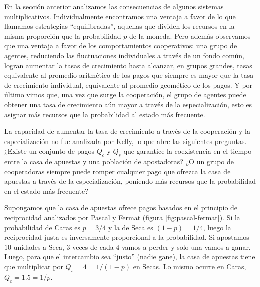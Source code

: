 \documentclass[a4paper,10pt]{book}
\theoremstyle{definition}
\begin{document}

En la sección anterior analizamos las consecuencias de algunos sistemas multiplicativos.
%
Individualmente encontramos una ventaja a favor de lo que llamamos estrategias ``equilibradas'', aquellas que dividen los recursos en la misma proporción que la probabilidad $p$ de la moneda.
%
Pero además observamos que una ventaja a favor de los comportamientos cooperativos: una grupo de agentes, reduciendo las fluctuaciones individuales a través de un fondo común, logran aumentar la tasas de crecimiento hasta alcanzar, en grupos grandes, tasas equivalente al promedio aritmético de los pagos que siempre es mayor que la tasa de crecimiento individual, equivalente al promedio geomético de los pagos.
%
Y por último vimos que, una vez que surge la cooperación, el grupo de agentes puede obtener una tasa de crecimiento aún mayor a través de la especialización, esto es asignar más recursos que la probabilidad al estado más frecuente. 


La capacidad de aumentar la tasa de crecimiento a través de la cooperación y la especialización no fue analizada por Kelly, lo que abre las siguientes preguntas.
%
¿Existe un conjunto de pagos $Q_c$ y $Q_s$ que garantice la coexistencia en el tiempo entre la casa de apuestas y una población de apostadoras?
%
¿O un grupo de cooperadoras siempre puede romper cualquier pago que ofrezca la casa de apuestas a través de la especialización, poniendo más recursos que la probabilidad en el estado más frecuente?


Supongamos que la casa de apuestas ofrece pagos basados en el principio de reciprocidad analizados por Pascal y Fermat (figura \ref{fig:pascal-fermat}).
%
Si la probabilidad de Caras es $p=3/4$ y la de Seca es $(1-p) = 1/4$, luego la reciprocidad justa es inversamente proporcional a la probabilidad.
%
Si apostamos $10$ unidades a Seca, $3$ veces de cada $4$ vamos a perder y solo una vamos a ganar.
%
Luego, para que el intercambio sea ``justo'' (nadie gane), la casa de apuestas tiene que multiplicar por $Q_s = 4 = 1/(1-p)$ en Secas.
%
Lo mismo ocurre en Caras, $Q_c = 1.5 = 1/p$.

\end{document}
